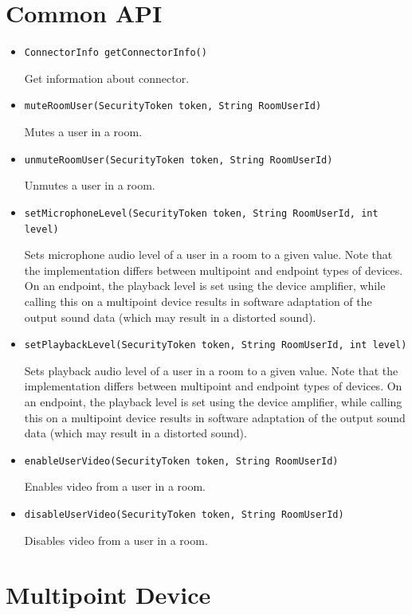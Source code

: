 \documentclass[a4paper]{report}
\newenvironment{Api}{\begin{itemize}}{\end{itemize}}
\newcommand{\ApiCode}[1]{\lstinline[style=styleApi]|#1|}
\newcommand{\ApiItem}[1]{\item #1 %

}
\newcommand{\ApiCmd}[1]{\ApiItem{\ApiCode{#1}}}
\begin{document}
\section{Common API}

\begin{Api}

\ApiCmd{ConnectorInfo getConnectorInfo()}
Get information about connector.

\ApiCmd{muteRoomUser(SecurityToken token, String RoomUserId)}
Mutes a user in a room.

\ApiCmd{unmuteRoomUser(SecurityToken token, String RoomUserId)}
Unmutes a user in a room.

\ApiCmd{setMicrophoneLevel(SecurityToken token, String RoomUserId, int level)}
Sets microphone audio level of a user in a room to a given value. Note that the implementation differs between multipoint and endpoint types of devices. On an endpoint, the playback level is set using the device amplifier, while calling this on a multipoint device results in software adaptation of the output sound data (which may result in a distorted sound).

\ApiCmd{setPlaybackLevel(SecurityToken token, String RoomUserId, int level)}
Sets playback audio level of a user in a room to a given value. Note that the implementation differs between multipoint and endpoint types of devices. On an endpoint, the playback level is set using the device amplifier, while calling this on a multipoint device results in software adaptation of the output sound data (which may result in a distorted sound).

\ApiCmd{enableUserVideo(SecurityToken token, String RoomUserId)}
Enables video from a user in a room.

\ApiCmd{disableUserVideo(SecurityToken token, String RoomUserId)}
Disables video from a user in a room.

\end{Api}

\section{Multipoint Device} \label{sect:connector-api-multipoint}
\end{document}
